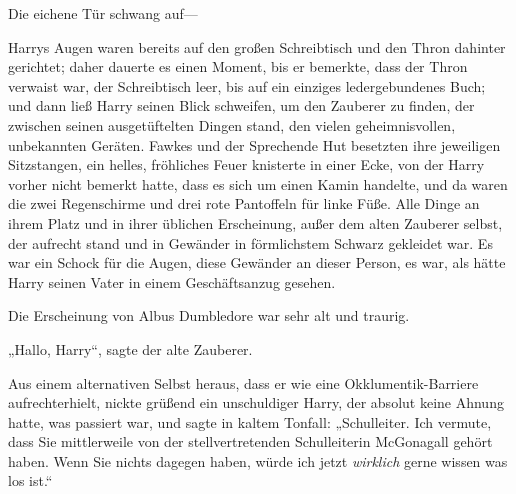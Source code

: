 Die eichene Tür schwang auf—

Harrys Augen waren bereits auf den großen Schreibtisch und den Thron dahinter gerichtet; daher dauerte es einen Moment, bis er bemerkte, dass der Thron verwaist war, der Schreibtisch leer, bis auf ein einziges ledergebundenes Buch; und dann ließ Harry seinen Blick schweifen, um den Zauberer zu finden, der zwischen seinen ausgetüftelten Dingen stand, den vielen geheimnisvollen, unbekannten Geräten. Fawkes und der Sprechende Hut besetzten ihre jeweiligen Sitzstangen, ein helles, fröhliches Feuer knisterte in einer Ecke, von der Harry vorher nicht bemerkt hatte, dass es sich um einen Kamin handelte, und da waren die zwei Regenschirme und drei rote Pantoffeln für linke Füße. Alle Dinge an ihrem Platz und in ihrer üblichen Erscheinung, außer dem alten Zauberer selbst, der aufrecht stand und in Gewänder in förmlichstem Schwarz gekleidet war. Es war ein Schock für die Augen, diese Gewänder an dieser Person, es war, als hätte Harry seinen Vater in einem Geschäftsanzug gesehen.

Die Erscheinung von Albus Dumbledore war sehr alt und traurig.

„Hallo, Harry“, sagte der alte Zauberer.

Aus einem alternativen Selbst heraus, dass er wie eine Okklumentik-Barriere aufrechterhielt, nickte grüßend ein unschuldiger Harry, der absolut keine Ahnung hatte, was passiert war, und sagte in kaltem Tonfall: „Schulleiter. Ich vermute, dass Sie mittlerweile von der stellvertretenden Schulleiterin McGonagall gehört haben. Wenn Sie nichts dagegen haben, würde ich jetzt \emph{wirklich} gerne wissen was los ist.“


